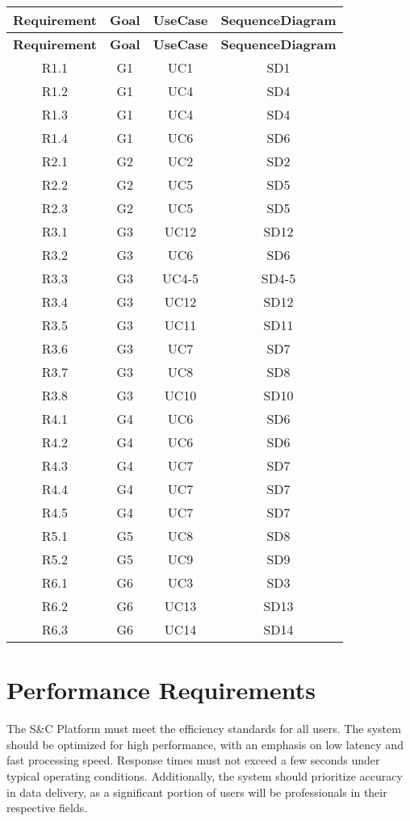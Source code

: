 \begin{longtable}{cccc}
    
    \toprule
    \textbf{Requirement} & \textbf{Goal} & \textbf{UseCase} & \textbf{SequenceDiagram} \\
    \midrule
    \endfirsthead
    
    \toprule
    \textbf{Requirement} & \textbf{Goal} & \textbf{UseCase} & \textbf{SequenceDiagram} \\
    \midrule
    \endhead
    
    \bottomrule
    \endfoot
    
    R1.1 & G1 & UC1    & SD1  \\
    R1.2 & G1 & UC4    & SD4  \\
    R1.3 & G1 & UC4    & SD4  \\
    R1.4 & G1 & UC6  & SD6 \\
    R2.1 & G2 & UC2    & SD2  \\
    R2.2 & G2 & UC5    & SD5  \\
    R2.3 & G2 & UC5  & SD5 \\
    R3.1 & G3 & UC12  & SD12 \\
    R3.2 & G3 & UC6 & SD6 \\
    R3.3 & G3 & UC4-5  & SD4-5 \\
    R3.4 & G3 & UC12  & SD12 \\
    R3.5 & G3 & UC11  & SD11 \\
    R3.6 & G3 & UC7   & SD7  \\
    R3.7 & G3 & UC8    & SD8  \\
    R3.8 & G3 & UC10    & SD10  \\
    R4.1 & G4 & UC6  & SD6 \\
    R4.2 & G4 & UC6 & SD6 \\
    R4.3 & G4 & UC7  & SD7 \\
    R4.4 & G4 & UC7  & SD7 \\
    R4.5 & G4 & UC7  & SD7 \\
    R5.1 & G5 & UC8    & SD8  \\
    R5.2 & G5 & UC9    & SD9  \\
    R6.1 & G6 & UC3    & SD3  \\
    R6.2 & G6 & UC13  & SD13 \\
    R6.3 & G6 & UC14 & SD14 \\


    \end{longtable}

    
\section{Performance Requirements}
The S\&C Platform must meet the efficiency standards for all users. 
The system should be optimized for high performance, with an emphasis on low latency and fast processing speed. 
Response times must not exceed a few seconds under typical operating conditions.
 Additionally, the system should prioritize accuracy in data delivery, as a significant portion of users will be professionals in their respective fields.

